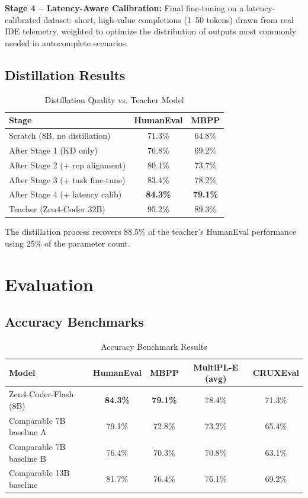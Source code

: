 \documentclass[11pt,a4paper]{article}
\begin{document}
\textbf{Stage 4 -- Latency-Aware Calibration:} Final fine-tuning on a latency-calibrated dataset: short, high-value completions (1--50 tokens) drawn from real IDE telemetry, weighted to optimize the distribution of outputs most commonly needed in autocomplete scenarios.

\subsection{Distillation Results}

\begin{table}[H]
\centering
\caption{Distillation Quality vs. Teacher Model}
\begin{tabular}{lcc}
\toprule
\textbf{Stage} & \textbf{HumanEval} & \textbf{MBPP} \\
\midrule
Scratch (8B, no distillation) & 71.3\% & 64.8\% \\
After Stage 1 (KD only) & 76.8\% & 69.2\% \\
After Stage 2 (+ rep alignment) & 80.1\% & 73.7\% \\
After Stage 3 (+ task fine-tune) & 83.4\% & 78.2\% \\
After Stage 4 (+ latency calib) & \textbf{84.3\%} & \textbf{79.1\%} \\
Teacher (Zen4-Coder 32B) & 95.2\% & 89.3\% \\
\bottomrule
\end{tabular}
\end{table}

The distillation process recovers 88.5\% of the teacher's HumanEval performance using 25\% of the parameter count.

\section{Evaluation}

\subsection{Accuracy Benchmarks}

\begin{table}[H]
\centering
\caption{Accuracy Benchmark Results}
\begin{tabular}{lcccc}
\toprule
\textbf{Model} & \textbf{HumanEval} & \textbf{MBPP} & \textbf{MultiPL-E (avg)} & \textbf{CRUXEval} \\
\midrule
Zen4-Coder-Flash (8B) & \textbf{84.3\%} & \textbf{79.1\%} & 78.4\% & 71.3\% \\
Comparable 7B baseline A & 79.1\% & 72.8\% & 73.2\% & 65.4\% \\
Comparable 7B baseline B & 76.4\% & 70.3\% & 70.8\% & 63.1\% \\
Comparable 13B baseline & 81.7\% & 76.4\% & 76.1\% & 69.2\% \\
\bottomrule
\end{tabular}
\end{table}
\end{document}
